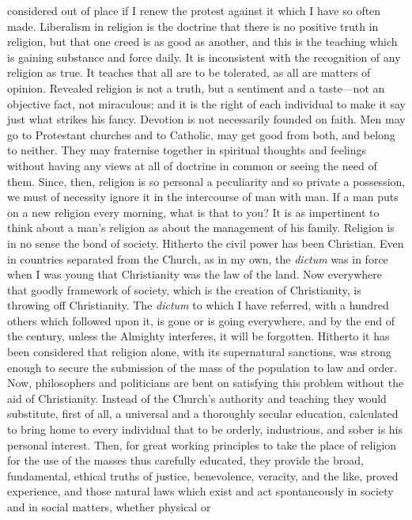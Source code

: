 considered out of place if I renew the protest against it which I have
so often made. Liberalism in religion is the doctrine that there is no
positive truth in religion, but that one creed is as good as another,
and this is the teaching which is gaining substance and force daily.
It is inconsistent with the recognition of any religion as true. It
teaches that all are to be tolerated, as all are matters of opinion.
Revealed religion is not a truth, but a sentiment and a taste—not an
objective fact, not miraculous; and it is the right of each individual
to make it say just what strikes his fancy. Devotion is not
necessarily founded on faith. Men may go to Protestant churches and to
Catholic, may get good from both, and belong to neither. They may
fraternise together in spiritual thoughts and feelings without having
any views at all of doctrine in common or seeing the need of them.
Since, then, religion is so personal a peculiarity and so private a
possession, we must of necessity ignore it in the intercourse of man
with man. If a man puts on a new religion every morning, what is that
to you? It is as impertinent to think about a man's religion as about
the management of his family. Religion is in no sense the bond of
society. Hitherto the civil power has been Christian. Even in
countries separated from the Church, as in my own, the \emph{dictum}
was in force when I was young that Christianity was the law of the
land. Now everywhere that goodly framework of society, which is the
creation of Christianity, is throwing off Christianity. The \emph{dictum}
to which I have referred, with a hundred others which followed upon
it, is gone or is going everywhere, and by the end of the century,
unless the Almighty interferes, it will be forgotten. Hitherto it has
been considered that religion alone, with its supernatural sanctions,
was strong enough to secure the submission of the mass of the
population to law and order. Now, philosophers and politicians are
bent on satisfying this problem without the aid of Christianity.
Instead of the Church's authority and teaching they would substitute,
first of all, a universal and a thoroughly secular education,
calculated to bring home to every individual that to be orderly,
industrious, and sober is his personal interest. Then, for great
working principles to take the place of religion for the use of the
masses thus carefully educated, they provide the broad, fundamental,
ethical truths of justice, benevolence, veracity, and the like, proved
experience, and those natural laws which exist and act spontaneously
in society and in social matters, whether physical or
